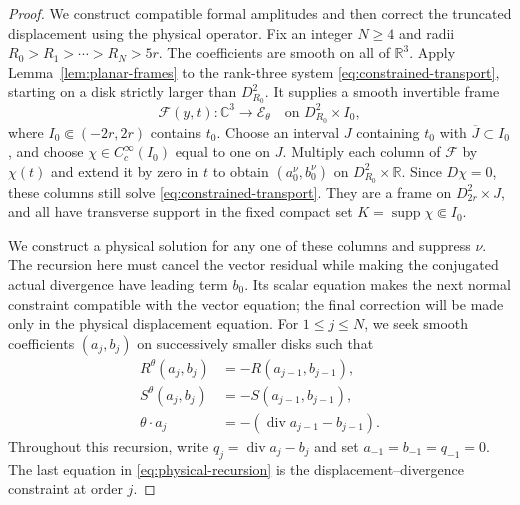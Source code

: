 \documentclass[11pt]{article}
\newcommand{\R}{\mathbb R}
\newcommand{\C}{\mathbb C}
\DeclareMathOperator{\supp}{supp}
\DeclareMathOperator{\diverg}{div}
\newcommand{\Ecal}{\mathcal E}
\theoremstyle{remark}
\numberwithin{equation}{section}
\begin{document}
\begin{proof}
We construct compatible formal amplitudes and then correct the
truncated displacement using the physical operator.
Fix an integer $N\ge4$ and radii
$R_0>R_1>\cdots>R_N>5r$. The coefficients are smooth on all of
$\R^3$. Apply Lemma~\ref{lem:planar-frames} to the rank-three
system \eqref{eq:constrained-transport}, starting on a disk
strictly larger than $D_{R_0}^2$. It supplies a smooth
invertible frame
\[
 \mathcal F(y,t):\C^3\longrightarrow\Ecal_\theta
 \quad\text{on }D_{R_0}^2\times I_0,
\]
where $I_0\Subset(-2r,2r)$ contains $t_0$. Choose an interval
$J$ containing $t_0$ with $\overline J\subset I_0$, and choose
$\chi\in C_c^\infty(I_0)$ equal to one on $J$. Multiply each
column of $\mathcal F$ by $\chi(t)$ and extend it by zero in
$t$ to obtain $(a_0^{\nu},b_0^{\nu})$ on
$D_{R_0}^2\times\R$. Since $D\chi=0$, these columns still
solve \eqref{eq:constrained-transport}. They are a frame on
$D_{2r}^2\times J$, and all have transverse support in the
fixed compact set $K=\supp\chi\Subset I_0$.

We construct a physical solution for any one of these columns
and suppress $\nu$. The recursion here must cancel the vector residual
while making the conjugated actual divergence have leading term $b_0$.
Its scalar equation makes the next normal constraint compatible with
the vector equation;
the final correction will be made only in the physical displacement
equation. For $1\le j\le N$, we seek smooth coefficients $(a_j,b_j)$
on successively smaller disks such that
\begin{equation}
\label{eq:physical-recursion}
\begin{aligned}
 R^\theta(a_j,b_j)&=-R(a_{j-1},b_{j-1}),\\
 S^\theta(a_j,b_j)&=-S(a_{j-1},b_{j-1}),\\
 \theta\cdot a_j&=-(\diverg a_{j-1}-b_{j-1}).
\end{aligned}
\end{equation}
Throughout this recursion, write $q_j=\diverg a_j-b_j$ and set
$a_{-1}=b_{-1}=q_{-1}=0$.
The last equation in \eqref{eq:physical-recursion} is the
displacement--divergence constraint at order $j$.


\end{proof}
\end{document}
